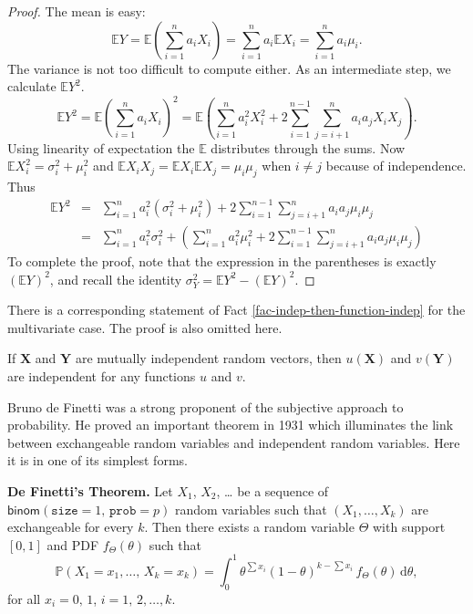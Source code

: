 \documentclass[captions=tableheading]{scrbook}
\begin{document}
\begin{proof}
The mean is easy:
\[
\mathbb{E} Y=\mathbb{E}\left(\sum_{i=1}^{n}a_{i}X_{i}\right)=\sum_{i=1}^{n}a_{i}\mathbb{E} X_{i}=\sum_{i=1}^{n}a_{i}\mu_{i}.
\]
The variance is not too difficult to compute either. As an intermediate step, we calculate \(\mathbb{E} Y^{2}\). 
\[
\mathbb{E} Y^{2}=\mathbb{E}\left(\sum_{i=1}^{n}a_{i}X_{i}\right)^{2}=\mathbb{E}\left(\sum_{i=1}^{n}a_{i}^{2}X_{i}^{2}+2\sum_{i=1}^{n-1}\sum_{j=i+1}^{n}a_{i}a_{j}X_{i}X_{j}\right).
\]
Using linearity of expectation the \(\mathbb{E}\) distributes through the sums. Now \(\mathbb{E} X_{i}^{2}=\sigma_{i}^{2}+\mu_{i}^{2}\) and \(\mathbb{E} X_{i}X_{j}=\mathbb{E} X_{i}\mathbb{E} X_{j}=\mu_{i}\mu_{j}\) when \(i\neq j\) because of independence. Thus
\begin{eqnarray*}
\mathbb{E} Y^{2} & = & \sum_{i=1}^{n}a_{i}^{2}(\sigma_{i}^{2}+\mu_{i}^{2})+2\sum_{i=1}^{n-1}\sum_{j=i+1}^{n}a_{i}a_{j}\mu_{i}\mu_{j}\\
 & = & \sum_{i=1}^{n}a_{i}^{2}\sigma_{i}^{2}+\left(\sum_{i=1}^{n}a_{i}^{2}\mu_{i}^{2}+2\sum_{i=1}^{n-1}\sum_{j=i+1}^{n}a_{i}a_{j}\mu_{i}\mu_{j}\right)
\end{eqnarray*}
To complete the proof, note that the expression in the parentheses is exactly \(\left(\mathbb{E} Y\right)^{2}\), and recall the identity \(\sigma_{Y}^{2}=\mathbb{E} Y^{2}-\left(\mathbb{E} Y\right)^{2}\).  
\end{proof}

There is a corresponding statement of Fact \ref{fac-indep-then-function-indep} for the multivariate case. The proof is also omitted here. 

\begin{fact}
If \(\mathbf{X}\) and \(\mathbf{Y}\) are mutually independent random vectors, then \(u(\mathbf{X})\) and \(v(\mathbf{Y})\) are independent for any functions \(u\) and \(v\).
\end{fact}

Bruno de Finetti was a strong proponent of the subjective approach to probability. He proved an important theorem in 1931 which illuminates the link between exchangeable random variables and independent random variables. Here it is in one of its simplest forms. 

\begin{thm}
\textbf{De Finetti's Theorem.} Let \(X_{1}\), \(X_{2}\), \ldots{} be a sequence of \(\mathsf{binom}(\mathtt{size}=1,\,\mathtt{prob}=p)\) random variables such that \((X_{1},\ldots,X_{k})\) are exchangeable for every \(k\). Then there exists a random variable \(\Theta\) with support \([0,1]\) and PDF \(f_{\Theta}(\theta)\) such that
\begin{equation}
\mathbb{P}(X_{1}=x_{1},\ldots,\, X_{k}=x_{k})=\int_{0}^{1}\theta^{\sum x_{i}}(1-\theta)^{k-\sum x_{i}}\, f_{\Theta}(\theta)\,\mathrm{d}\theta,\label{eq-definetti-binary}
\end{equation}
for all \(x_{i}=0,\,1\), \(i=1,\,2,\ldots,k\).
\end{thm}
\end{document}
